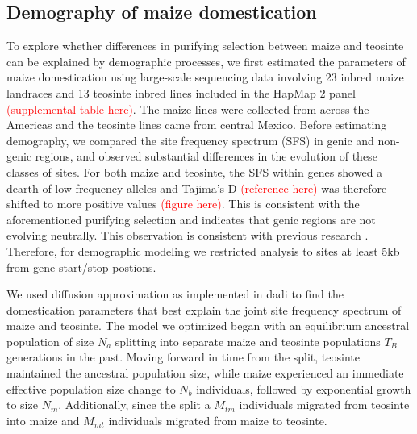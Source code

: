 \documentclass{pnastwo}
\begin{document}
\begin{article}
\subsection{Demography of maize domestication}
To explore whether differences in purifying selection between maize
and teosinte can be explained by demographic processes, we
first estimated the parameters of maize domestication using large-scale
sequencing data involving 23 inbred maize
landraces and 13 teosinte inbred lines included in the HapMap 2 panel
\cite{chia2012} \textcolor{red}{(supplemental table here)}. The maize
lines were collected from across the Americas and the teosinte lines
came from central Mexico. Before estimating demography, we compared
the site frequency spectrum (SFS) in genic and non-genic regions, and
observed substantial differences in the evolution of these classes of
sites. For both maize and teosinte, the SFS within genes showed a
dearth of low-frequency alleles and Tajima's D
\textcolor{red}{(reference here)} was therefore shifted
to more positive values \textcolor{red}{(figure here)}. This is consistent with the aforementioned purifying
selection and indicates that genic regions are not evolving
neutrally. This observation is consistent with previous research \cite{hufford2012}. Therefore, for demographic modeling we restricted analysis
to sites at least 5kb from gene start/stop postions.

We used diffusion approximation as implemented in
dadi \cite{gutenkunst2009} to find the domestication parameters that best explain
the joint site frequency spectrum of maize and teosinte.  The model we optimized began with an
equilibrium ancestral population of size $N_a$
splitting into separate maize and teosinte populations $T_B$ generations in the past. Moving forward in
time from the split, teosinte maintained the ancestral population size, while
maize experienced an immediate effective population size change to
$N_b$ individuals, followed by exponential growth to size
$N_m$. Additionally, since the split a $M_{tm}$ individuals migrated
from teosinte into maize and $M_{mt}$ individuals migrated from maize
to teosinte.


\end{article}
\end{document}

